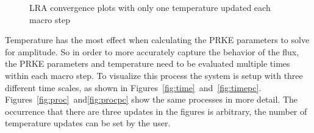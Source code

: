 \documentclass[11pt]{scrartcl}
\begin{document}
\begin{figure}[!htpb]
\centering
{}
\hspace{-15mm}
\caption{LRA convergence plots with only one temperature updated each macro step}
\end{figure}

Temperature has the most effect when calculating the PRKE parameters to solve for amplitude.  So in order to more accurately capture the behavior of the flux, the PRKE parameters and temperature need to be evaluated multiple times within each macro step. To visualize this process the system is setup with three different time scales, as shown in Figures~\ref{fig:time}~and~\ref{fig:timepc}.  Figures~\ref{fig:proc}~and\ref{fig:procpc} show the same processes in more detail.  The occurrence that there are three updates in the figures is arbitrary, the number of temperature updates can be set by the user.
\end{document}
